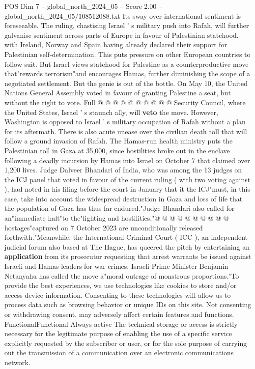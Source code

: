 \begin{textsample}{POS Dim 7 – global\_north\_2024\_05 – Score 2.00 – global\_north\_2024\_05/108512088.txt}
Its sway over international sentiment is foreseeable.
The ruling, chastising Israel ' s military push into Rafah, will further galvanise sentiment across parts of Europe in favour of Palestinian statehood, with Ireland, Norway and Spain having already declared their support for Palestinian self-determination.
This puts pressure on other European countries to follow suit.
But Israel views statehood for Palestine as a counterproductive move that"rewards terrorism"and encourages Hamas, further diminishing the scope of a negotiated settlement.
But the genie is out of the bottle.
On May 10, the United Nations General Assembly voted in favour of granting Palestine a seat, but without the right to vote.
Full @ @ @ @ @ @ @ @ @ @ Security Council, where the United States, Israel ' s staunch ally, will \textbf{veto} the move.
However, Washington is opposed to Israel ' s military occupation of Rafah without a plan for its aftermath.
There is also acute unease over the civilian death toll that will follow a ground invasion of Rafah.
The Hamas-run health ministry puts the Palestinian toll in Gaza at 35,000, since hostilities broke out in the enclave following a deadly incursion by Hamas into Israel on October 7 that claimed over 1,200 lives.
Judge Dalveer Bhandari of India, who was among the 13 judges on the ICJ panel that voted in favour of the current ruling ( with two voting against ), had noted in his filing before the court in January that it the ICJ"must, in this case, take into account the widespread destruction in Gaza and loss of life that the population of Gaza has thus far endured."Judge Bhandari also called for an"immediate halt"to the"fighting and hostilities,"@ @ @ @ @ @ @ @ @ @ hostages"captured on 7 October 2023 are unconditionally released forthwith."Meanwhile, the International Criminal Court ( ICC ), an independent judicial forum also based at The Hague, has queered the pitch by entertaining an \textbf{application} from its prosecutor requesting that arrest warrants be issued against Israeli and Hamas leaders for war crimes.
Israeli Prime Minister Benjamin Netanyahu has called the move a"moral outrage of monstrous proportions."To provide the best experiences, we use technologies like cookies to store and/or access device information.
Consenting to these technologies will allow us to process data such as browsing behavior or unique IDs on this site.
Not consenting or withdrawing consent, may adversely affect certain features and functions.
FunctionalFunctional Always active The technical storage or access is strictly necessary for the legitimate purpose of enabling the use of a specific service explicitly requested by the subscriber or user, or for the sole purpose of carrying out the transmission of a communication over an electronic communications network.

\end{textsample}
